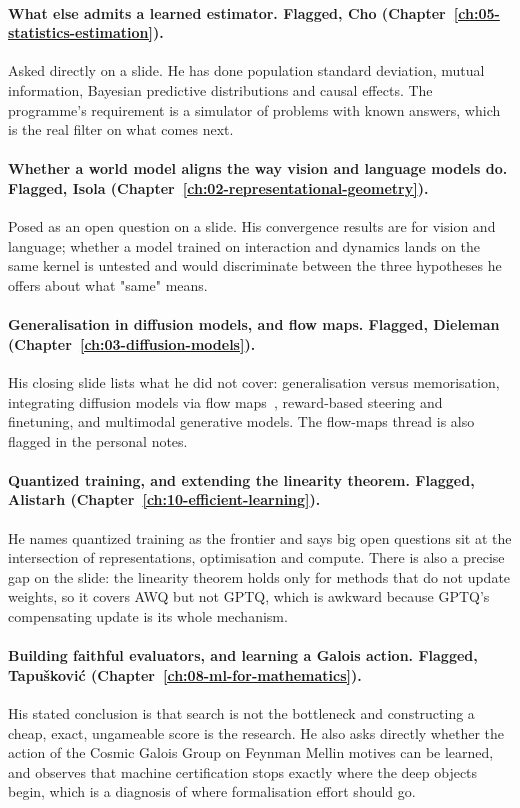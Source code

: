 \paragraph{What else admits a learned estimator. Flagged, Cho
(Chapter~\ref{ch:05-statistics-estimation}).} Asked directly on a slide. He has done population
standard deviation, mutual information, Bayesian predictive distributions and causal effects. The
programme's requirement is a simulator of problems with known answers, which is the real filter on
what comes next.

\paragraph{Whether a world model aligns the way vision and language models do. Flagged, Isola
(Chapter~\ref{ch:02-representational-geometry}).} Posed as an open question on a slide. His
convergence results are for vision and language; whether a model trained on interaction and dynamics
lands on the same kernel is untested and would discriminate between the three hypotheses he offers
about what "same" means.

\paragraph{Generalisation in diffusion models, and flow maps. Flagged, Dieleman
(Chapter~\ref{ch:03-diffusion-models}).} His closing slide lists what he did not cover:
generalisation versus memorisation, integrating diffusion models via flow
maps~\citep{dieleman2026flowmaps}, reward-based steering and finetuning, and multimodal generative
models. The flow-maps thread is also flagged in the personal notes.

\paragraph{Quantized training, and extending the linearity theorem. Flagged, Alistarh
(Chapter~\ref{ch:10-efficient-learning}).} He names quantized training as the frontier and says big
open questions sit at the intersection of representations, optimisation and compute. There is also a
precise gap on the slide: the linearity theorem holds only for methods that do not update weights, so
it covers AWQ but not GPTQ, which is awkward because GPTQ's compensating update is its whole
mechanism.

\paragraph{Building faithful evaluators, and learning a Galois action. Flagged,
Tapu\v{s}kovi\'{c} (Chapter~\ref{ch:08-ml-for-mathematics}).} His stated conclusion is that search is
not the bottleneck and constructing a cheap, exact, ungameable score is the research. He also asks
directly whether the action of the Cosmic Galois Group on Feynman Mellin motives can be learned, and
observes that machine certification stops exactly where the deep objects begin, which is a diagnosis
of where formalisation effort should go.


